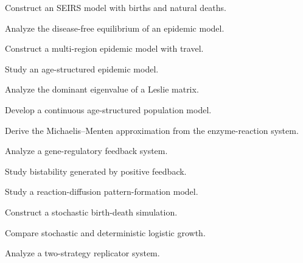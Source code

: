\begin{exercise}[4]
Construct an SEIRS model with births and natural deaths.
\end{exercise}

\begin{exercise}[4]
Analyze the disease-free equilibrium of an epidemic model.
\end{exercise}

\begin{exercise}[4]
Construct a multi-region epidemic model with travel.
\end{exercise}

\begin{exercise}[4]
Study an age-structured epidemic model.
\end{exercise}

\begin{exercise}[4]
Analyze the dominant eigenvalue of a Leslie matrix.
\end{exercise}

\begin{exercise}[4]
Develop a continuous age-structured population model.
\end{exercise}

\begin{exercise}[4]
Derive the Michaelis--Menten approximation from the enzyme-reaction system.
\end{exercise}

\begin{exercise}[4]
Analyze a gene-regulatory feedback system.
\end{exercise}

\begin{exercise}[4]
Study bistability generated by positive feedback.
\end{exercise}

\begin{exercise}[4]
Study a reaction-diffusion pattern-formation model.
\end{exercise}

\begin{exercise}[4]
Construct a stochastic birth-death simulation.
\end{exercise}

\begin{exercise}[4]
Compare stochastic and deterministic logistic growth.
\end{exercise}

\begin{exercise}[4]
Analyze a two-strategy replicator system.
\end{exercise}

